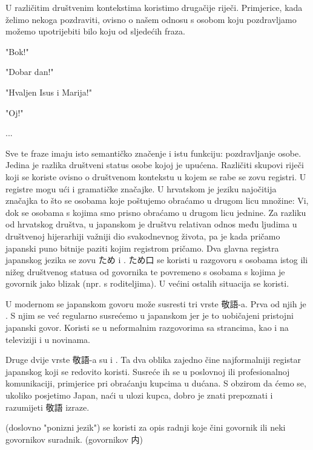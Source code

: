 
\author{Ivan Petranović}

	
		U različitim društvenim kontekstima koristimo drugačije riječi. Primjerice, kada želimo nekoga pozdraviti, ovisno o našem odnosu s osobom koju pozdravljamo možemo upotrijebiti bilo koju od sljedećih fraza.
		\begin{hyou}
		\item "Bok!"
		\item "Dobar dan!"
		\item "Hvaljen Isus i Marija!"
		\item "Oj!"
		\item ...
		\end{hyou}
	Sve te fraze imaju isto semantičko značenje i istu funkciju: pozdravljanje osobe. Jedina je razlika društveni status osobe kojoj je upućena. Različiti skupovi riječi koji se koriste ovisno o društvenom kontekstu u kojem se rabe se zovu registri. U registre mogu ući i gramatičke značajke. U hrvatskom je jeziku najočitija značajka to što se osobama koje poštujemo obraćamo u drugom licu množine: Vi, dok se osobama s kojima smo prisno obraćamo u drugom licu jednine.
	Za razliku od hrvatskog društva, u japanskom je društvu relativan odnos među ljudima u društvenoj hijerarhiji važniji dio svakodnevnog života, pa je kada pričamo japanski puno bitnije paziti kojim registrom pričamo.
	Dva glavna registra japanskog jezika se zovu ため i . ため口 se koristi u razgovoru s osobama istog ili nižeg društvenog statusa od govornika te povremeno s osobama s kojima je govornik jako blizak (npr. s roditeljima). U većini ostalih situacija se koristi.

		U modernom se japanskom govoru može susresti tri vrste 敬語-a. Prva od njih je . S njim se već regularno susrećemo u japanskom jer je to uobičajeni pristojni japanski govor. Koristi se u neformalnim razgovorima sa strancima, kao i na televiziji i u novinama.
		
		Druge dvije vrste 敬語-a su  i . Ta dva oblika zajedno čine najformalniji registar japanskog koji se redovito koristi. Susreće ih se u poslovnoj ili profesionalnoj komunikaciji, primjerice pri obraćanju kupcima u dućana. S obzirom da ćemo se, ukoliko posjetimo Japan, naći u ulozi kupca, dobro je znati prepoznati i razumijeti 敬語 izraze.
	
		 (doslovno "ponizni jezik") se koristi za opis radnji koje čini govornik ili neki govornikov suradnik. (govornikov 内)
